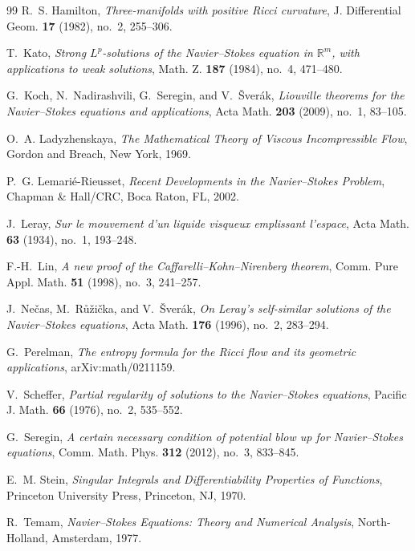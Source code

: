 \documentclass[11pt]{amsart}
\numberwithin{equation}{section}
\theoremstyle{plain}
\theoremstyle{definition}
\theoremstyle{remark}
\begin{document}
\begin{thebibliography}{99}
R.~S. Hamilton,
\emph{Three-manifolds with positive Ricci curvature},
J. Differential Geom. \textbf{17} (1982), no.~2, 255--306.

T.~Kato,
\emph{Strong \(L^p\)-solutions of the Navier--Stokes equation in
\(\mathbb R^m\), with applications to weak solutions},
Math. Z. \textbf{187} (1984), no.~4, 471--480.

G.~Koch, N.~Nadirashvili, G.~Seregin, and V.~{\v S}ver\'ak,
\emph{Liouville theorems for the Navier--Stokes equations and applications},
Acta Math. \textbf{203} (2009), no.~1, 83--105.

O.~A. Ladyzhenskaya,
\emph{The Mathematical Theory of Viscous Incompressible Flow},
Gordon and Breach, New York, 1969.

P.~G. Lemari\'e-Rieusset,
\emph{Recent Developments in the Navier--Stokes Problem},
Chapman \& Hall/CRC, Boca Raton, FL, 2002.

J.~Leray,
\emph{Sur le mouvement d'un liquide visqueux emplissant l'espace},
Acta Math. \textbf{63} (1934), no.~1, 193--248.

F.-H.~Lin,
\emph{A new proof of the Caffarelli--Kohn--Nirenberg theorem},
Comm. Pure Appl. Math. \textbf{51} (1998), no.~3, 241--257.

J.~Ne\v cas, M.~R\r u\v zi\v cka, and V.~{\v S}ver\'ak,
\emph{On Leray's self-similar solutions of the Navier--Stokes equations},
Acta Math. \textbf{176} (1996), no.~2, 283--294.

G.~Perelman,
\emph{The entropy formula for the Ricci flow and its geometric applications},
arXiv:math/0211159.

V.~Scheffer,
\emph{Partial regularity of solutions to the Navier--Stokes equations},
Pacific J. Math. \textbf{66} (1976), no.~2, 535--552.

G.~Seregin,
\emph{A certain necessary condition of potential blow up for Navier--Stokes
equations},
Comm. Math. Phys. \textbf{312} (2012), no.~3, 833--845.

E.~M. Stein,
\emph{Singular Integrals and Differentiability Properties of Functions},
Princeton University Press, Princeton, NJ, 1970.

R.~Temam,
\emph{Navier--Stokes Equations: Theory and Numerical Analysis},
North-Holland, Amsterdam, 1977.

\end{thebibliography}
\end{document}

